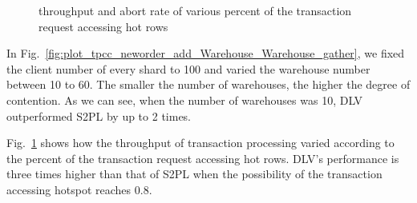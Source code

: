 \documentclass[conference]{IEEEtran}
\begin{document}
\begin{figure}[tbp]
  \centering
\caption{throughput and abort rate of various percent of the transaction request accessing hot rows}
\label{fig:plot_tpcc_neworder_add_HotItem_HotItem_gather}
\end{figure}

In Fig.~\ref{fig:plot_tpcc_neworder_add_Warehouse_Warehouse_gather}, we fixed the client number of every shard to 100 and varied the warehouse number between 10 to 60.
The smaller the number of warehouses, the higher the degree of contention. 
As we can see, when the number of warehouses was 10, DLV outperformed S2PL by up to 2 times.

Fig.~\ref{fig:plot_tpcc_neworder_add_HotItem_HotItem_gather} shows how the throughput of transaction processing varied according to the percent of the transaction request accessing hot rows.
DLV's performance is three times higher than that of S2PL when the possibility of the transaction accessing hotspot reaches 0.8.
\end{document}
